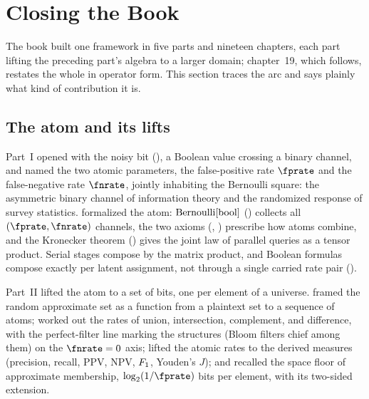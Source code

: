 %

\section{Closing the Book}
\label{sec:closing-the-book}

The book built one framework in five parts and nineteen chapters, each
part lifting the preceding part's algebra to a larger domain; chapter~19,
which follows, restates the whole in operator form. This section traces
the arc and says plainly what kind of contribution it is.

\subsection*{The atom and its lifts}

Part~I opened with the noisy bit (), a Boolean value
crossing a binary channel, and named the two atomic parameters, the
false-positive rate $\fprate$ and the false-negative rate $\fnrate$,
jointly inhabiting the Bernoulli square: the asymmetric binary channel of
information theory and the randomized response of survey statistics.
 formalized the atom: $\mathrm{Bernoulli}[\mathrm{bool}]$
() collects all $(\fprate, \fnrate)$ channels, the
two axioms (, ) prescribe
how atoms combine, and the Kronecker theorem () gives
the joint law of parallel queries as a tensor product. Serial stages
compose by the matrix product, and Boolean formulas compose exactly per
latent assignment, not through a single carried rate pair
().

Part~II lifted the atom to a set of bits, one per element of a universe.
 framed the random approximate set as a function
from a plaintext set to a sequence of atoms; 
worked out the rates of union, intersection, complement, and difference,
with the perfect-filter line marking the structures (Bloom filters chief
among them) on the $\fnrate = 0$ axis;
 lifted the atomic rates to the derived
measures (precision, recall, PPV, NPV, $F_1$, Youden's $J$); and
 recalled the space floor of approximate
membership, $\log_2(1/\fprate)$ bits per element, with its two-sided
extension.

